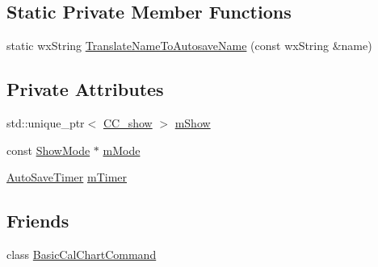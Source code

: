 \subsection*{Static Private Member Functions}
\begin{DoxyCompactItemize}
\item 
static wx\-String \hyperlink{a00020_a7945816f5d04a38baeef9c503e3f4402}{Translate\-Name\-To\-Autosave\-Name} (const wx\-String \&name)
\end{DoxyCompactItemize}
\subsection*{Private Attributes}
\begin{DoxyCompactItemize}
\item 
std\-::unique\-\_\-ptr$<$ \hyperlink{a00046}{C\-C\-\_\-show} $>$ \hyperlink{a00020_a42ef10531f8c3d4a0bedc609fdf66936}{m\-Show}
\item 
const \hyperlink{a00140}{Show\-Mode} $\ast$ \hyperlink{a00020_ae511411f0afc9c334fea3f2df435e893}{m\-Mode}
\item 
\hyperlink{a00016}{Auto\-Save\-Timer} \hyperlink{a00020_a74f920890947909b3c2a8d8cac6d1f78}{m\-Timer}
\end{DoxyCompactItemize}
\subsection*{Friends}
\begin{DoxyCompactItemize}
\item 
class \hyperlink{a00020_abdbcdfbd8a7d6cea4cf9e05b947e47d0}{Basic\-Cal\-Chart\-Command}
\end{DoxyCompactItemize}


